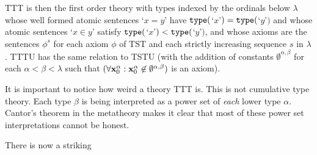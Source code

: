 \documentclass[12pt]{article}
\begin{document}
TTT is then the first order theory with types indexed by the ordinals below $\lambda$ whose well formed atomic sentences `$x=y$' have ${\tt type}($`$x$'$) = {\tt type}($`$y$'$)$ and whose atomic sentences `$x \in y$' satisfy ${\tt type}($`$x$'$) < {\tt type}($`$y$'$)$, and whose axioms are the sentences $\phi^s$ for each axiom $\phi$ of TST and each strictly increasing sequence $s$ in $\lambda$.  TTTU has the same relation to TSTU (with the addition of constants $\emptyset^{\alpha,\beta}$ for each $\alpha<\beta<\lambda$  such that $(\forall {\bf x}_0^{\alpha} :{\bf x}_0^{\alpha}\not\in \emptyset^{\alpha,\beta})$ is an axiom).

It is important to notice how weird a theory TTT is.  This is not cumulative type theory.  Each type $\beta$ is being interpreted as a power set of {\em each\/} lower type $\alpha$.  Cantor's theorem in the metatheory makes it clear that most of these power set interpretations cannot be honest.

There is now a striking
\end{document}
